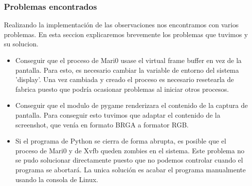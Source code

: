 \subsubsection*{Problemas encontrados}

Realizando la implementación de las observaciones nos encontramos con varios problemas. En esta seccion explicaremos brevemente los problemas que tuvimos y su solucion.

\begin{itemize}
    \item Conseguir que el proceso de Mari0 usase el virtual frame buffer en vez de la pantalla. Para esto, es necesario cambiar la variable de entorno del sistema 'display'. Una vez cambiada y creado el proceso es necesario resetearla de fabrica puesto que podría ocasionar problemas al iniciar otros procesos.
    \item Conseguir que el modulo de pygame renderizara el contenido de la captura de pantalla. Para conseguir esto tuvimos que adaptar el contenido de la screenshot, que venía en formato BRGA a formator RGB.
    \item Si el programa de Python se cierra de forma abrupta, es posible que el proceso de Mari0 y de Xvfb queden zombies en el sistema. Este problema no se pudo solucionar directamente puesto que no podemos controlar cuando el programa se abortará. La unica solución es acabar el programa manualmente usando la consola de Linux.
\end{itemize}



